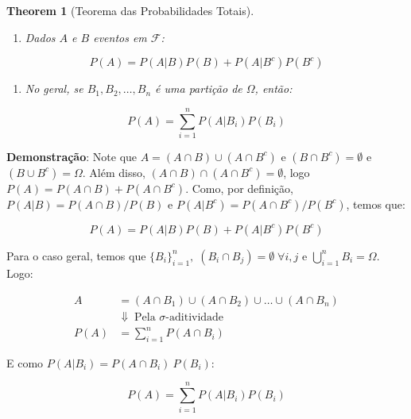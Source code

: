 \documentclass[
]{article}
\providecommand{\tightlist}{%
  \setlength{\itemsep}{0pt}\setlength{\parskip}{0pt}}
\newtheorem{theorem}{Theorem}[section]
\theoremstyle{definition}
\theoremstyle{definition}
\theoremstyle{definition}
\theoremstyle{definition}
\theoremstyle{remark}
\begin{document}
\begin{theorem}[Teorema das Probabilidades Totais]
\leavevmode

\begin{enumerate}
\def\labelenumi{\arabic{enumi}.}
\tightlist
\item
  Dados \(A\) e \(B\) eventos em \(\mathcal{F}\):
\end{enumerate}

\begin{equation*}
P(A) = P(A|B)P(B) + P(A|B^{c})P(B^{c})
\end{equation*}

\begin{enumerate}
\def\labelenumi{\arabic{enumi}.}
\setcounter{enumi}{1}
\tightlist
\item
  No geral, se \(B_{1},B_{2}, \ldots, B_{n}\) é uma partição de \(\Omega\), então:
\end{enumerate}

\begin{equation}
P(A) = \sum_{i=1}^{n}P(A|B_{i})P(B_{i})
\label{eq:teorprobtotal}
\end{equation}

\end{theorem}

\textbf{Demonstração}: Note que \(A = (A \cap B) \cup (A \cap B^{c})\) e \((B \cap B^{c}) = \emptyset\) e \((B \cup B^{c}) = \Omega\). Além disso, \((A \cap B) \cap (A \cap B^{c}) = \emptyset\), logo \(P(A) = P(A \cap B) + P(A \cap B^{c})\). Como, por definição, \(P(A|B) = P(A \cap B) / P(B)\) e \(P(A|B^{c}) = P(A \cap B^{c}) / P(B^{c})\), temos que:

\begin{equation*}
P(A) = P(A|B)P(B) + P(A|B^{c})P(B^{c})
\end{equation*}

Para o caso geral, temos que \(\{B_{i}\}_{i=1}^{n} , \; (B_{i} \cap B_{j}) = \emptyset \; \forall i,j\) e \(\bigcup_{i=1}^{n}B_{i} = \Omega\). Logo:

\begin{align*}
A &= (A \cap B_{1}) \cup (A \cap B_{2}) \cup \ldots \cup (A \cap B_{n}) \\
&\Downarrow \; \text{Pela }\sigma\text{-aditividade} \\
P(A) &= \sum_{i=1}^{n}P(A \cap B_{i})
\end{align*}

E como \(P(A|B_{i}) = P(A \cap B_{i}) \ P(B_{i})\):

\begin{equation*}
P(A) = \sum_{i=1}^{n}P(A|B_{i})P(B_{i})
\end{equation*}
\end{document}
